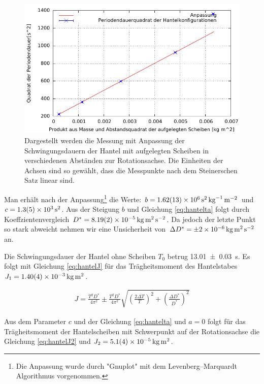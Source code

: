 \begin{figure}[h]
	\centering
	\includegraphics[width=0.7\linewidth]{auswertung/hantel/HantelF}
	\caption{Dargestellt werden die Messung mit Anpassung der Schwingungsdauern der Hantel mit aufgelegten Scheiben in verschiedenen Abständen zur Rotationsachse. Die Einheiten der Achsen sind so gewählt, dass die Messpunkte nach dem Steinerschen Satz linear sind.  }
	\label{fig:hantel}
\end{figure}

 Man erhält nach der Anpassung\footnote{Die Anpassung wurde durch "Gnuplot" mit dem Levenberg–Marquardt Algorithmus vorgenommen.  } die Werte: $ b               = \SI{1.62   \pm 0.13 e+006}{\second \squared \per \kilogram \per \metre \squared} $ und $c               = \SI{ 1.3      +-0.5e3 }   {\second \squared}$.  Aus der Steigung $b$ und Gleichung \ref{eq:hantelta} folgt durch Koeffzientenvergleich $D^*=\SI{8.19+-0.02e-5}{\kilogram \metre \squared \per \second \squared }$. Da jedoch der letzte Punkt so stark abweicht nehmen wir eine Unsicherheit von $\Delta D^*= \SI{\pm 2e-6}{\kilogram \metre \squared \per \second \squared }$ an.








Die Schwingungsdauer der Hantel ohne Scheiben $T_0$  betrug \SI{13.01 \pm 0.03}{s}. Es folgt mit Gleichung \ref{eq:hantelJ} für das Trägheitsmoment des Hantelstabes $J_1 = \SI{1.40+-0.04e-3}{\kilogram \metre \squared}$.



\begin{align}
	J=\frac{T^2 D^*}{4 \pi^2} \pm \frac{T^2 D^*}{4 \pi^2} \sqrt{
	\left(\frac{2 \Delta T}{T} \right)^2 + 	\left(\frac{\Delta D^*}{D^*} \right)^2 }
\label{eq:hantelJ}
\end{align}




Aus dem Parameter $c$ und der Gleichung \ref{eq:hantelta} und $a=0$  folgt für das Trägheitsmoment der Hantelscheiben mit Schwerpunkt auf der Rotationsachse die Gleichung \ref{eq:hantelJ2} und $J_2=\SI{5.1+-0.4e-5 }{\kilogram \metre \squared}$.


